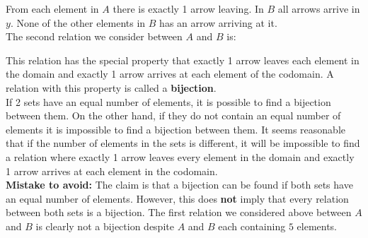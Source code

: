 \noindent From each element in $A$ there is exactly 1 arrow leaving. In $B$ all arrows arrive in $y$. None of the other elements in $B$ has an arrow arriving at it.\\

\noindent The second relation we consider between $A$ and $B$ is:\\
\begin{center}
\end{center}

\noindent This relation has the special property that exactly 1 arrow leaves each element in the domain and exactly 1 arrow arrives at each element of the codomain. A relation with this property is called a \textbf{bijection}.\\

\noindent If 2 sets have an equal number of elements, it is possible to find a bijection between them. On the other hand, if they do not contain an equal number of elements it is impossible to find a bijection between them. It seems reasonable that if the number of elements in the sets is different, it will be impossible to find a relation where exactly 1 arrow leaves every element in the domain and exactly 1 arrow arrives at each element in the codomain.\\

\noindent \textbf{Mistake to avoid:} The claim is that a bijection can be found if both sets have an equal number of elements. However, this does \textbf{not} imply that every relation between both sets is a bijection. The first relation we considered above between $A$ and $B$ is clearly not a bijection despite $A$ and $B$ each containing $5$ elements.

